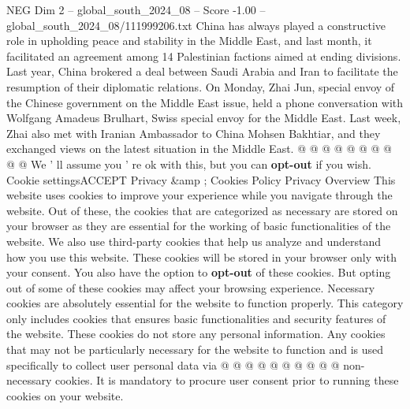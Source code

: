 \begin{textsample}{NEG Dim 2 – global\_south\_2024\_08 – Score -1.00 – global\_south\_2024\_08/111999206.txt}
China has always played a constructive role in upholding peace and stability in the Middle East, and last month, it facilitated an agreement among 14 Palestinian factions aimed at ending divisions.
Last year, China brokered a deal between Saudi Arabia and Iran to facilitate the resumption of their diplomatic relations.
On Monday, Zhai Jun, special envoy of the Chinese government on the Middle East issue, held a phone conversation with Wolfgang Amadeus Brulhart, Swiss special envoy for the Middle East.
Last week, Zhai also met with Iranian Ambassador to China Mohsen Bakhtiar, and they exchanged views on the latest situation in the Middle East. @ @ @ @ @ @ @ @ @ @ We ' ll assume you ' re ok with this, but you can \textbf{opt-out} if you wish.
Cookie settingsACCEPT Privacy \&amp ; Cookies Policy Privacy Overview This website uses cookies to improve your experience while you navigate through the website.
Out of these, the cookies that are categorized as necessary are stored on your browser as they are essential for the working of basic functionalities of the website.
We also use third-party cookies that help us analyze and understand how you use this website.
These cookies will be stored in your browser only with your consent.
You also have the option to \textbf{opt-out} of these cookies.
But opting out of some of these cookies may affect your browsing experience.
Necessary cookies are absolutely essential for the website to function properly.
This category only includes cookies that ensures basic functionalities and security features of the website.
These cookies do not store any personal information.
Any cookies that may not be particularly necessary for the website to function and is used specifically to collect user personal data via @ @ @ @ @ @ @ @ @ @ non-necessary cookies.
It is mandatory to procure user consent prior to running these cookies on your website.

\end{textsample}
